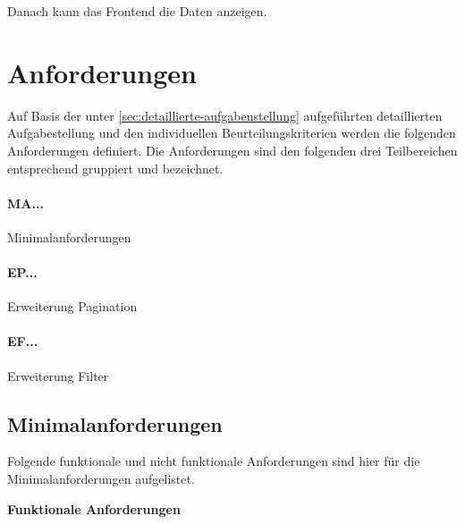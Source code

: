 Danach kann das Frontend die Daten anzeigen.
\newpage
\section{Anforderungen}
Auf Basis der unter \ref{sec:detaillierte-aufgabenstellung} aufgeführten detaillierten Aufgabestellung und den individuellen Beurteilungskriterien werden die folgenden Anforderungen definiert. Die Anforderungen sind den folgenden drei Teilbereichen entsprechend gruppiert und bezeichnet.

\paragraph{MA...} Minimalanforderungen
\paragraph{EP...} Erweiterung Pagination
\paragraph{EF...} Erweiterung Filter

\subsection{Minimalanforderungen}\label{ch:minimalanforderungen}
Folgende funktionale und nicht funktionale Anforderungen sind hier für die Minimalanforderungen aufgelistet.\newline

\noindent \textbf{Funktionale Anforderungen}

